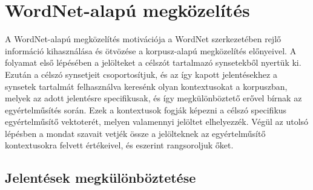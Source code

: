 \documentclass{llncs}
\begin{document}
\section{WordNet-alap\'{u} megk\"{o}zel\'{i}t\'{e}s}

A WordNet-alap\'{u} megk\"{o}zel\'{i}t\'{e}s motiv\'{a}ci\'{o}ja a WordNet szerkezet\'{e}ben rejl\H{o} inform\'{a}ci\'{o} kihaszn\'{a}l\'{a}sa \'{e}s \"{o}tv\"{o}z\'{e}se a korpusz-alap\'{u} megk\"{o}zel\'{i}t\'{e}s el\H{o}nyeivel. A folyamat els\H{o} l\'{e}p\'{e}s\'{e}ben a jel\"{o}lteket a c\'{e}lsz\'{o}t tartalmaz\'{o} synsetekb\H{o}l nyert\"{u}k ki. Ezut\'{a}n a c\'{e}lsz\'{o} synsetjeit csoportos\'{i}tjuk, \'{e}s az \'{i}gy kapott jelent\'{e}sekhez a synsetek tartalm\'{a}t felhaszn\'{a}lva keres\'{e}nk olyan kontextusokat a korpuszban, melyek az adott jelent\'{e}sre specifikusak, \'{e}s \'{i}gy megk\"{u}l\"{o}nb\"{o}ztet\H{o} er\H{o}vel b\'{i}rnak az egy\'{e}rtelm\H{u}s\'{i}t\'{e}s sor\'{a}n. Ezek a kontextusok fogj\'{a}k k\'{e}pezni a c\'{e}lsz\'{o} specifikus egy\'{e}rtelm\H{u}s\'{i}t\H{o} vektoter\'{e}t, melyen valamennyi jel\"{o}ltet elhelyezz\'{e}k. V\'{e}g\"{u}l az utols\'{o} l\'{e}p\'{e}sben a mondat szavait vetj\'{e}k \"{o}ssze a jel\"{o}lteknek az egy\'{e}rtelm\H{u}s\'{i}t\H{o} kontextusokra felvett \'{e}rt\'{e}keivel, \'{e}s eszerint rangsoroljuk \H{o}ket.


\subsection{Jelent\'{e}sek megk\"{u}l\"{o}nb\"{o}ztet\'{e}se}
\end{document}

